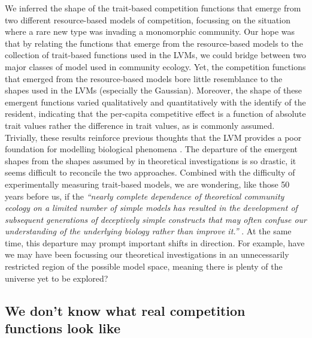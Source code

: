\documentclass[a4paper,11pt]{article}
\begin{document}
We inferred the shape of the trait-based competition functions that emerge from two different resource-based models of competition, focussing on the situation where a rare new type was invading a monomorphic community. Our hope was that by relating the functions that emerge from the resource-based models to the collection of trait-based functions used in the LVMs, we could bridge between two major classes of model used in community ecology. Yet, the competition functions that emerged from the resource-based models bore little resemblance to the shapes used in the LVMs (especially the Gaussian). Moreover, the shape of these emergent functions varied qualitatively and quantitatively with the identify of the resident, indicating that the per-capita competitive effect is a function of absolute trait values rather the difference in trait values, as is commonly assumed. Trivially, these results reinforce previous thoughts that the LVM provides a poor foundation for modelling biological phenomena \citep[e.g.][]{Andrewartha-1953,  Neill-1974, Abrams-1975, Wangersky-1978,Abrams-1980, Tilman-1987, Abrams-2008}. The departure of the emergent shapes from the shapes assumed by in theoretical investigations is so drastic, it seems difficult to reconcile the two approaches. Combined with the difficulty of experimentally measuring trait-based models, we are wondering, like those 50 years before us, if the  \emph{``nearly complete dependence of theoretical community ecology on a limited number of simple models has resulted in the development of subsequent generations of deceptively simple constructs that may often confuse our understanding of the underlying biology rather than improve it.''}  \citep{Neill-1974}. At the same time, this departure may prompt important shifts in direction. For example, have we may have been focussing our theoretical investigations in an unnecessarily restricted region of the possible model space, meaning there is plenty of the universe yet to be explored?

\subsection{We don't know what real competition functions look like}
\end{document}
